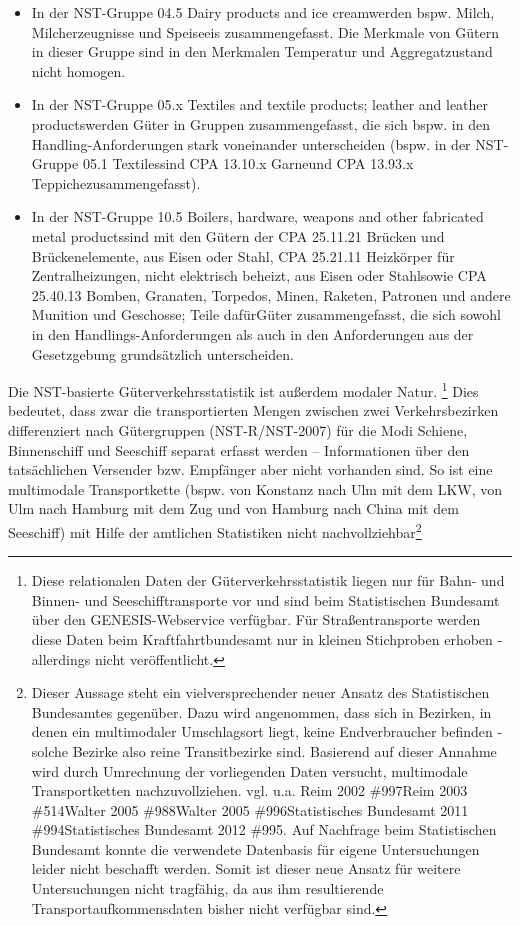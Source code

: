 \begin{itemize}
%
   \item In der NST-Gruppe 04.5 \glqq Dairy products and ice cream\grqq  werden bspw. Milch, Milcherzeugnisse und Speiseeis zusammengefasst. Die Merkmale von Gütern in dieser Gruppe sind in den Merkmalen Temperatur und Aggregatzustand nicht homogen.
   \item In der NST-Gruppe 05.x \glqq Textiles and textile products; leather and leather products\grqq  werden Güter in Gruppen zusammengefasst, die sich bspw. in den Handling-Anforderungen stark voneinander unterscheiden (bspw. in der NST-Gruppe 05.1 \glqq Textiles\grqq  sind \glqq CPA 13.10.x Garne\grqq  und \glqq CPA 13.93.x Teppiche\grqq  zusammengefasst).
   \item In der NST-Gruppe 10.5 \glqq Boilers, hardware, weapons and other fabricated metal products\grqq  sind mit den Gütern der CPA 25.11.21 \glqq Brücken und Brückenelemente, aus Eisen oder Stahl\grqq , CPA 25.21.11 \glqq Heizkörper für Zentralheizungen, nicht elektrisch beheizt, aus Eisen oder Stahl\grqq  sowie CPA 25.40.13 \glqq Bomben, Granaten, Torpedos, Minen, Raketen, Patronen und andere Munition und Geschosse; Teile dafür\grqq  Güter zusammengefasst, die sich sowohl in den Handlings-Anforderungen als auch in den Anforderungen aus der Gesetzgebung grundsätzlich unterscheiden.
%
\end{itemize}
Die NST-basierte Güterverkehrsstatistik ist außerdem modaler Natur. \footnote{%
 Diese relationalen Daten der Güterverkehrsstatistik liegen nur für Bahn- und Binnen- und Seeschifftransporte vor und sind beim Statistischen Bundesamt über den GENESIS-Webservice verfügbar. Für Straßentransporte werden diese Daten beim Kraftfahrtbundesamt nur in kleinen Stichproben erhoben - allerdings nicht veröffentlicht.
}%
 Dies bedeutet, dass zwar die transportierten Mengen zwischen zwei Verkehrsbezirken differenziert nach Gütergruppen (NST-R/NST-2007) für die Modi Schiene, Binnenschiff und Seeschiff separat erfasst werden – Informationen über den tatsächlichen Versender bzw. Empfänger aber nicht vorhanden sind. So ist eine multimodale Transportkette (bspw. von Konstanz nach Ulm mit dem LKW, von Ulm nach Hamburg mit dem Zug und von Hamburg nach China mit dem Seeschiff) mit Hilfe der amtlichen Statistiken nicht nachvollziehbar\footnote{%
 Dieser Aussage steht ein vielversprechender neuer Ansatz des Statistischen Bundesamtes gegenüber. Dazu wird angenommen, dass sich in Bezirken, in denen ein multimodaler Umschlagsort liegt, keine Endverbraucher befinden - solche Bezirke also reine Transitbezirke sind. Basierend auf dieser Annahme wird durch Umrechnung der vorliegenden Daten versucht, multimodale Transportketten nachzuvollziehen. {vgl. u.a.  Reim 2002 \#997}{Reim 2003 \#514}{Walter 2005 \#988}{Walter 2005 \#996}{Statistisches Bundesamt 2011 \#994}{Statistisches Bundesamt 2012 \#995}. Auf Nachfrage beim Statistischen Bundesamt konnte die verwendete Datenbasis für eigene Untersuchungen leider nicht beschafft werden. Somit ist dieser neue Ansatz für weitere Untersuchungen nicht tragfähig, da aus ihm resultierende Transportaufkommensdaten bisher nicht verfügbar sind.
}%
